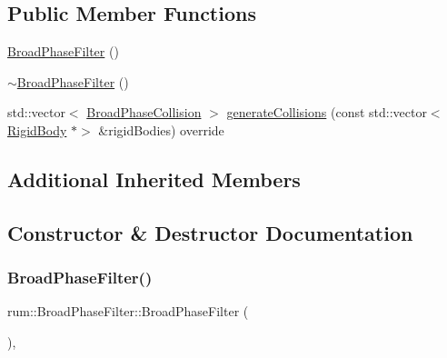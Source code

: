 \subsection*{Public Member Functions}
\begin{DoxyCompactItemize}
\item 
\mbox{\hyperlink{classrum_1_1_broad_phase_filter_aa5dd2587c050641e37b68ad86b8ecae5}{Broad\+Phase\+Filter}} ()
\item 
\mbox{\hyperlink{classrum_1_1_broad_phase_filter_a453256d2b6d6287cdbeed4a42fcfa18b}{$\sim$\+Broad\+Phase\+Filter}} ()
\item 
std\+::vector$<$ \mbox{\hyperlink{structrum_1_1_broad_phase_collision}{Broad\+Phase\+Collision}} $>$ \mbox{\hyperlink{classrum_1_1_broad_phase_filter_a093dbf88b707226854b0042d60a1b128}{generate\+Collisions}} (const std\+::vector$<$ \mbox{\hyperlink{classrum_1_1_rigid_body}{Rigid\+Body}} $\ast$$>$ \&rigid\+Bodies) override
\end{DoxyCompactItemize}
\subsection*{Additional Inherited Members}


\subsection{Constructor \& Destructor Documentation}
\mbox{\label{classrum_1_1_broad_phase_filter_aa5dd2587c050641e37b68ad86b8ecae5}} 
\subsubsection{\texorpdfstring{Broad\+Phase\+Filter()}{BroadPhaseFilter()}}
{\footnotesize\ttfamily rum\+::\+Broad\+Phase\+Filter\+::\+Broad\+Phase\+Filter (\begin{DoxyParamCaption}{ }\end{DoxyParamCaption})\hspace{0.3cm}{\ttfamily [explicit]}, {\ttfamily [default]}}

\mbox{\label{classrum_1_1_broad_phase_filter_a453256d2b6d6287cdbeed4a42fcfa18b}} 
